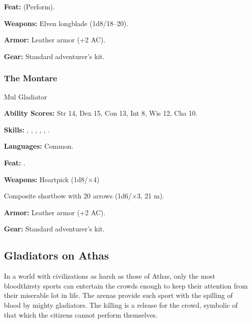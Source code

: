 \textbf{Feat:}  (Perform).

\textbf{Weapons:} Elven longblade (1d8/18--20).

\textbf{Armor:} Leather armor (+2 AC).

\textbf{Gear:} Standard adventurer's kit.

\subsubsection{The Montare}
Mul Gladiator

\textbf{Ability Scores:} Str 14, Dex 15, Con 13, Int 8, Wis 12, Cha 10.

\textbf{Skills:} , , , , , .

\textbf{Languages:} Common.

\textbf{Feat:} .

\textbf{Weapons:} Heartpick (1d8/$\times$4)

Composite shortbow with 20 arrows (1d6/$\times$3, 21 m).

\textbf{Armor:} Leather armor (+2 AC).

\textbf{Gear:} Standard adventurer's kit.

\subsection{Gladiators on Athas}

In a world with civilizations as harsh as those of Athas, only the most bloodthirsty sports can entertain the crowds enough to keep their attention from their miserable lot in life. The arenas provide such sport with the spilling of blood by mighty gladiators. The killing is a release for the crowd, symbolic of that which the citizens cannot perform themselves.

